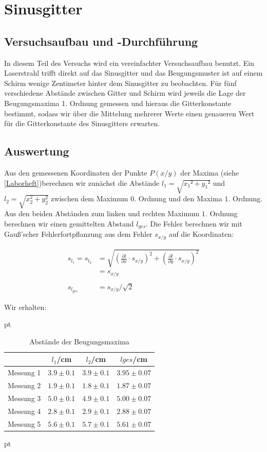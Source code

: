 \documentclass[12pt]{article}
\newcommand{\del}[2][]{\frac{\partial #1}{\partial #2}}
\begin{document}
\newpage

\section{Sinusgitter}


\subsection{Versuchsaufbau und -Durchführung}

In diesem Teil des Versuchs wird ein vereinfachter Versuchsaufbau benutzt. Ein Laserstrahl trifft direkt auf das Sinusgitter und das Beugungsmuster ist auf einem Schirm wenige Zentimeter hinter dem Sinusgitter zu beobachten. Für fünf verschiedene Abstände zwischen Gitter und Schirm wird jeweils die Lage der Beugungsmaxima 1. Ordnung gemessen und hieraus die Gitterkonstante bestimmt, sodass wir über die Mittelung mehrerer Werte einen genaueren Wert für die Gitterkonstante des Sinusgitters erwarten.



\newpage
\subsection{Auswertung}

Aus den gemessenen Koordinaten der Punkte $P(x/y)$ der Maxima (siehe \ref{Laborheft})berechnen wir zunächst die Abstände $l_1 = \sqrt{x_1²+y_1²}$ und $l_2= \sqrt{x_2^2+y_2^2} $ zwischen dem Maximum $0.$ Ordnung und den Maxima $1.$ Ordnung. Aus den beiden Abständen zum linken und rechten Maximum $1.$ Ordnung berechnen wir einen gemittelten Abstand $l_{ges}$. Die Fehler berechnen wir mit Gauß'scher Fehlerfortpflanzung aus dem Fehler $s_{x/y}$ auf die Koordinaten:

\begin{align*}
s_{l_1} = s_{l_2} &= \sqrt{\left(\del[l]{x}\cdot s_{x/y}\right)^2+\left(\del[l]{y}\cdot s_{x/y}\right)^2}\\
&= s_{x/y}\\
\  \\
s_{l_{ges}} &= s_{x/y}/\sqrt{2}
\end{align*}

Wir erhalten:

  pt
 \begin{table}[h!]
 {\centering{}
\begin{tabular}{c||c|c|c}
 					& $l_1$/cm 	& $l_2$/cm & $l{ges}$/cm	\\ \hline\hline
Messung 1		& $3.9 \pm 0.1$ 	&  $3.9 \pm 0.1$    	&  $3.95 \pm 0.07$ \\ \hline 
Messung 2	&	 $1.9 \pm 0.1$ 	   	&  $1.8 \pm 0.1$  	&  $1.87 \pm 0.07$  \\ \hline
Messung 3      	&  $5.0 \pm 0.1$  	&  $4.9 \pm 0.1$  &  $5.00 \pm 0.07$  \\ \hline
Messung 4    & $2.8 \pm 0.1$ & $2.9 \pm 0.1$ &   $2.88 \pm 0.07$        \\ \hline                                           
Messung 5  & $5.6 \pm 0.1$  & $5.7 \pm 0.1$ & $5.61 \pm 0.07$
 \end{tabular}
 \caption{Abstände der Beugungsmaxima}}
\end{table}
 pt
\end{document}
